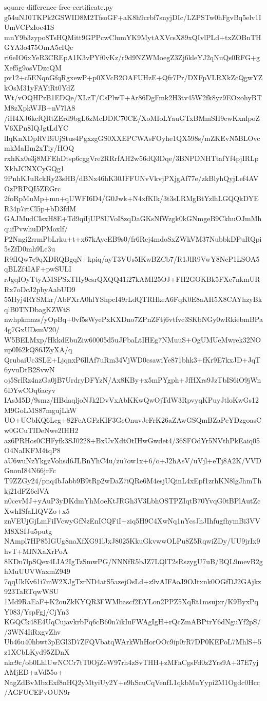 \documentclass[11pt]{article}
\theoremstyle{definition}
\theoremstyle{remark}
\begin{document}
\begin{filecontents*}[overwrite]{square-difference-free-certificate.py}
g54uNJ0TKPk2GSWID8M2TfsoGF+aK8h9crbf7snyjDIc/LZPSTw0hFgvBq5elv1IUmVCPzIoe41S
mnY9b3zypo8TsHQMitt9GPPcwClumYK9MytAXVcsX89xQIvlPLd+txZOBnTHGYA3o475OmA5cIQc
ri6eIO6xYeR3CREpA1K3vPYf0vKz/r9d9NZWMoegZ3Zj6kleYJ2qNuQs0RFG+gXef5g9osVDzcQM
pv12+c5ENqnGfqRgxewP+p0XVcB2OAFUHzE+Qfr7Pr/DXFpVLRXkZcQgwYZkOsM31yFAYiRt0YdZ
Wt/vOQHPrB1EDQe/XLzT/CsPlwT+Ar86DgFmk2H3tv45W2fk8yz9EOxohyBTM8zXpkWJB+nV7lA8
/iH4XJ6kcfQRtZErd9bgL6zMcDDlC70CE/XoMIoLYauGTxBMmSH9ewKxnlpoZV6XPn8IQJgtLdYC
lIqKnXDpRVBiUjStus4PgxzgGS0XXEPCWAsFOyhe1QX598s/mZKEvN5BLOvcmkMaIIm2xTiy/HOQ
rxhKx0e3j8MFEhDtsp6cggVre2RRrfAH2w56dQ3Dqe/3BNPDNHTtafYf4pjIRLpXkbJCNXCyGQg1
9PnhKJuRckRy23sHB/dBNx46hK30JFFUNvVkvjPXjgAf77e/zkBlyhQyjLef4AVOzPRPQI5ZEGrc
2foRpMuMp+mn+qUWFI6D4/G0Jwk+N4xfKIk/3t3sLRMgBtYzlhLGQQkDYER34p7rtCl5p+bD3fdM
GAJMudCIsxH8E+Td9qiIjUP8UVoI8zqDaGKsNfWzgk0kGNmgeB9CkhuOJmMhqufPvwhuDPMoxlf/
P2Nngi2rrmPbLrku+t+x67kAycEB9s0/fr6Rej4mdoSxZWkVM37NubbkDPuRQpi5sZfD0mh9Lc3u
R9fIQw7e9qXDRQBgqN+kpiq/ayT3VUs5IKwBZCb7/R1JlR9VwY8NcP1LSOA5qBLZf4IAF+pwSULI
rJgqIOyTtyAMSPSxTHy9csrQXQQ41i27kAMI25OJ+FH2GOKBk5FXe7nkmURRx7oDcJ2pbyAabUD9
55Hyj4RYSMkr/AbFXrA0hlYShpcI49rLdQTRHkeA6FqK0E8aAH5X8CAYhzyBkqlB0TNDbagKZWtS
nwhpkmazs/yOpBq+0vf5sWyePxKXDno7ZPnZFtj6vtfvc3SKbNGy0wRkiebmBPa4g7GxUDsmV20/
W5BELMxp/HkkdEbuZiw60005d5uJFbaLtIHEg7NMuuS+OgUMUeMwrek32NOup0I62kQ86JZyXA/q
QrubaiUc3SLE+LjqnxP6IlAf7uRm34VjWD0csawiYe871bhk3+fKr9E7kxJD+JqT6yvuDtB2SvwN
oj5SrlRz4nzGa0jB7UrdryDFYzN/Ax8KBy+x5mPYgph+JfHXrs9JzTbIS6iO9jWn6DYwCOq6acyv
IAsM5D/9smz/HBdaqljoNJk2DvVxAbKKwQwOjTdW3RpvyqKPuyJtloKwGs12M9GoLMS87mgujLkW
UO+UCbKQ6Lcg+82FeAGFzKIF3GeOnuvJeFrK26aZAwGSQmBZaPeYDzgoasCw0GCuTIDeNwe2IHH2
az6PRHos0CHFyfk3SJ0228+BxUvXdtOtIHwGwdet4/36SFOdYr5NVthPkEaiq05O4NaIKFM4tqP8
aU6wuNzYkgzVohsd6JLBnYhC4u/zu7ow1x+6/o+J2hAsV/uVjl+eTj8A2K/VVDGnonI84N66jrFc
T9ZZGy24/pnq4bJabb9B9tRp2wDaZ7iQRe6M4esjUQinL4xEpf1zrhKN8lgJhmThkj21dFZ6clVA
n0cevMJ+yAuP3yDKdmYhMoeKtJRGh3V3LbhOSTPZIqtB70YvqG0tBPlAutZcXwhISfaLlQVZo+x5
znVEUjGjLmFiIVcwyGfNzEnICQFiI+ziq5H9C4XwNq1nYcsJhJIhfugfhymBi3VVM8XSIJu5putg
NAmpl7HP85IGUg8naXfXG91lJxJ8025KkuGkvwwOLPu8Z5RqwiZDy/UU9jrIx9hvT+MINXaXrPoA
8KDn7lpSQex4LIA2IgTzSmwPG/NNNfR5bJZ7LQlT2sRszygU7uB/BQL9mevB2ghMuUUVWaxmZ949
7qqUkKv61i7mW2XJgTzrND4atS5azejOsLd+z9vAIFAoJ9OJtxnk0OGfDJ2GAjkz923TaRTqwWSU
1Md9RaEaF+K2ouZkKYQR3FWMbascf2EYLon2PPZ5XqRt1msujxr/K9ByxPqY083/YspFgj/CjYn3
KGQCk48E4UqCujavkrbPq6cB60n7ikIuFWAgIgH+rQcZmABPtrY6dNguYf2pS//3WN4IiRxgvZhv
Ub46u40hbwt3pEGl3D7ZFQVbatqWArkWhHorOOc9ip0rR7DP0KEPoL7MhlS+5z1XCbLKyd95ZDnX
nkc9c/ob0LhlUwNCCr7tT0OjZeW97rh4zSvTHH+zMFaCgsFd0z2Yrs9A+37E7yjAMjED+aVd55o+
NagZdBvMbxExf8nHQ2yMtyiUy2Y+e9hScuCqVenfL1qkbMuYypi2M1Ogdc0Hcc/AGFUCEPvOUN9r

\end{filecontents*}
\end{document}
